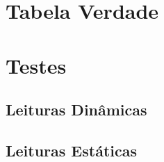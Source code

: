 \section{Tabela Verdade}


\section{Testes}

\subsection{Leituras Dinâmicas}






\subsection{Leituras Estáticas}







